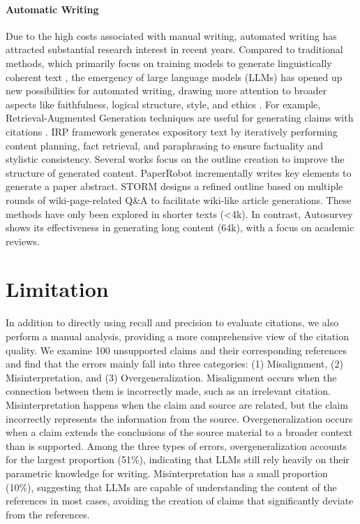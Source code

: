 \paragraph{Automatic Writing}
Due to the high costs associated with manual writing, automated writing has attracted substantial research interest in recent years. Compared to traditional methods, which primarily focus on training models to generate linguistically coherent text \citep{cho2018traingcohernt, bosselut2018awardcoherent}, the emergency of large language models (LLMs) has opened up new possibilities for automated writing, drawing more attention to broader aspects like faithfulness, logical structure, style, and ethics \citep{zhou2023contextfaithfulness, liu2024probingstructure, zhang2024style, schramowski2022ethics}. For example, Retrieval-Augmented Generation techniques are useful for generating claims with citations \citep{gao2023citation, menick2022teachingcitations}. IRP framework \citep{balepur2023expository} generates expository text by iteratively performing content planning, fact retrieval, and paraphrasing to ensure factuality and stylistic consistency.  Several works focus on the outline creation to improve the structure of generated content. PaperRobot \citep{wang2019paperrobot} incrementally writes key elements to generate a paper abstract. STORM \citep{shao2024assisting} designs a refined outline based on multiple rounds of wiki-page-related Q\&A to facilitate wiki-like article generations. These methods have only been explored in shorter texts (<4k). In contrast, Autosurvey shows its effectiveness in generating long content (64k), with a focus on academic reviews.

\section{Limitation}
In addition to directly using recall and precision to evaluate citations, we also perform a manual analysis, providing a more comprehensive view of the citation quality. We examine 100 unsupported claims and their corresponding references and find that the errors mainly fall into three categories: (1) Misalignment, (2) Misinterpretation, and (3) Overgeneralization. Misalignment occurs when the connection between them is incorrectly made, such as an irrelevant citation. Misinterpretation happens when the claim and source are related, but the claim incorrectly represents the information from the source. Overgeneralization occurs when a claim extends the conclusions of the source material to a broader context than is supported. Among the three types of errors, overgeneralization accounts for the largest proportion (51\%), indicating that LLMs still rely heavily on their parametric knowledge for writing. Misinterpretation has a small proportion (10\%), suggesting that LLMs are capable of understanding the content of the references in most cases, avoiding the creation of claims that significantly deviate from the references.


